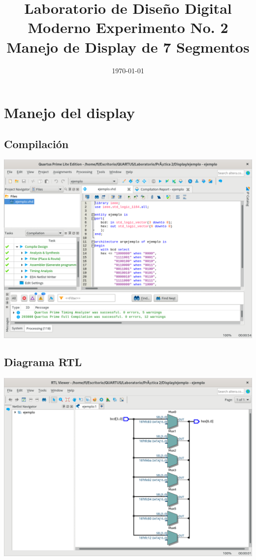 \documentclass[10pt,a4paper]{article}
\title{Laboratorio de Diseño Digital Moderno Experimento No. 2 Manejo de Display de 7 Segmentos}
\author{}
\date{\today}
\begin{document}
	\maketitle
	
	\section{Manejo del display}
	\subsection{Compilación}
	\begin{center}
		\includegraphics[scale=0.35]{Compilacion.png}
	\end{center}
	
	\subsection{Diagrama RTL}
	\begin{center}
		\includegraphics[scale=0.35]{RTL.png}
	\end{center}
	
\end{document}
